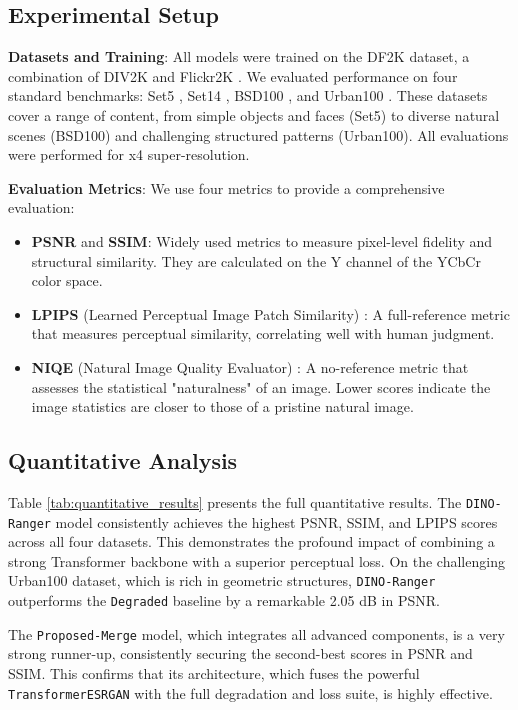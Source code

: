 \documentclass[10pt,twocolumn,letterpaper]{article}
\begin{document}
\subsection{Experimental Setup}
\textbf{Datasets and Training}: All models were trained on the DF2K dataset, a combination of DIV2K \cite{agustsson2017ntire} and Flickr2K \cite{timofte2017ntire}. We evaluated performance on four standard benchmarks: Set5 \cite{bevilacqua2012low}, Set14 \cite{zeyde2010single}, BSD100 \cite{martin2001database}, and Urban100 \cite{huang2015single}. These datasets cover a range of content, from simple objects and faces (Set5) to diverse natural scenes (BSD100) and challenging structured patterns (Urban100). All evaluations were performed for x4 super-resolution.

\textbf{Evaluation Metrics}: We use four metrics to provide a comprehensive evaluation:
\begin{itemize}
    \item \textbf{PSNR} and \textbf{SSIM}: Widely used metrics to measure pixel-level fidelity and structural similarity. They are calculated on the Y channel of the YCbCr color space.
    \item \textbf{LPIPS} (Learned Perceptual Image Patch Similarity) \cite{zhang2018unreasonable}: A full-reference metric that measures perceptual similarity, correlating well with human judgment.
    \item \textbf{NIQE} (Natural Image Quality Evaluator) \cite{mittal2012making}: A no-reference metric that assesses the statistical "naturalness" of an image. Lower scores indicate the image statistics are closer to those of a pristine natural image.
\end{itemize}

\subsection{Quantitative Analysis}
Table \ref{tab:quantitative_results} presents the full quantitative results. The \texttt{DINO-Ranger} model consistently achieves the highest PSNR, SSIM, and LPIPS scores across all four datasets. This demonstrates the profound impact of combining a strong Transformer backbone with a superior perceptual loss. On the challenging Urban100 dataset, which is rich in geometric structures, \texttt{DINO-Ranger} outperforms the \texttt{Degraded} baseline by a remarkable 2.05 dB in PSNR.

The \texttt{Proposed-Merge} model, which integrates all advanced components, is a very strong runner-up, consistently securing the second-best scores in PSNR and SSIM. This confirms that its architecture, which fuses the powerful \texttt{TransformerESRGAN} with the full degradation and loss suite, is highly effective.
\end{document}
